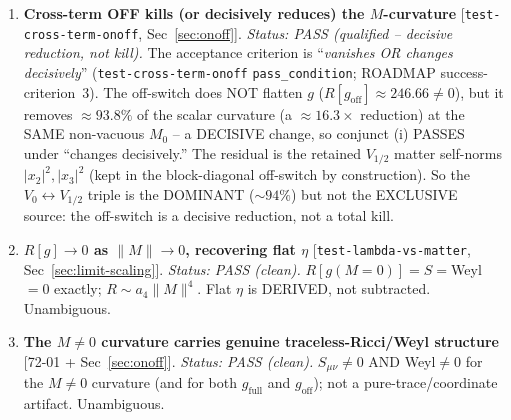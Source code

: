 \begin{enumerate}
  \item[(i)] \textbf{Cross-term OFF kills (or decisively reduces) the $M$-curvature}
        [\texttt{test-cross-term-onoff}, Sec~\ref{sec:onoff}].
        \emph{Status: PASS (qualified -- decisive reduction, not kill).} The acceptance
        criterion is ``\emph{vanishes OR changes decisively}'' (\texttt{test-cross-term-onoff}
        \texttt{pass\_condition}; ROADMAP success-criterion~3). The off-switch does NOT
        flatten $g$ ($R[g_{\mathrm{off}}]\approx246.66\neq0$), but it removes $\approx93.8\%$
        of the scalar curvature (a $\approx16.3\times$ reduction) at the SAME non-vacuous
        $M_0$ -- a DECISIVE change, so conjunct (i) PASSES under ``changes decisively.''
        The residual is the retained $V_{1/2}$ matter self-norms $|x_2|^2,|x_3|^2$ (kept in
        the block-diagonal off-switch by construction). So the
        $V_0\!\leftrightarrow\!V_{1/2}$ triple is the DOMINANT ($\sim94\%$) but not the
        EXCLUSIVE source: the off-switch is a decisive reduction, not a total kill.
  \item[(ii)] \textbf{$R[g]\to0$ as $\|M\|\to0$, recovering flat $\eta$}
        [\texttt{test-lambda-vs-matter}, Sec~\ref{sec:limit-scaling}].
        \emph{Status: PASS (clean).} $R[g(M{=}0)]=S=$Weyl$=0$ exactly; $R\sim a_4\|M\|^4$.
        Flat $\eta$ is DERIVED, not subtracted. Unambiguous.
  \item[(iii)] \textbf{The $M\neq0$ curvature carries genuine traceless-Ricci/Weyl
        structure} [72-01 + Sec~\ref{sec:onoff}].
        \emph{Status: PASS (clean).} $S_{\mu\nu}\neq0$ AND Weyl$\neq0$ for the $M\neq0$
        curvature (and for both $g_{\mathrm{full}}$ and $g_{\mathrm{off}}$); not a
        pure-trace/coordinate artifact. Unambiguous.
\end{enumerate}

